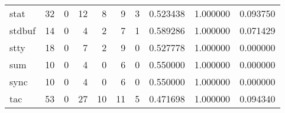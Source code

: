 \begin{longtable}{lrrrrrrrrr}
stat      &                                       32 &                                                  0 &                                                 12 &                                                  8 &                                                  9 &                                                  3 &                                           0.523438 &                               1.000000 &                             0.093750 \\
stdbuf    &                                       14 &                                                  0 &                                                  4 &                                                  2 &                                                  7 &                                                  1 &                                           0.589286 &                               1.000000 &                             0.071429 \\
stty      &                                       18 &                                                  0 &                                                  7 &                                                  2 &                                                  9 &                                                  0 &                                           0.527778 &                               1.000000 &                             0.000000 \\
sum       &                                       10 &                                                  0 &                                                  4 &                                                  0 &                                                  6 &                                                  0 &                                           0.550000 &                               1.000000 &                             0.000000 \\
sync      &                                       10 &                                                  0 &                                                  4 &                                                  0 &                                                  6 &                                                  0 &                                           0.550000 &                               1.000000 &                             0.000000 \\
tac       &                                       53 &                                                  0 &                                                 27 &                                                 10 &                                                 11 &                                                  5 &                                           0.471698 &                               1.000000 &                             0.094340 \\

\end{longtable}
